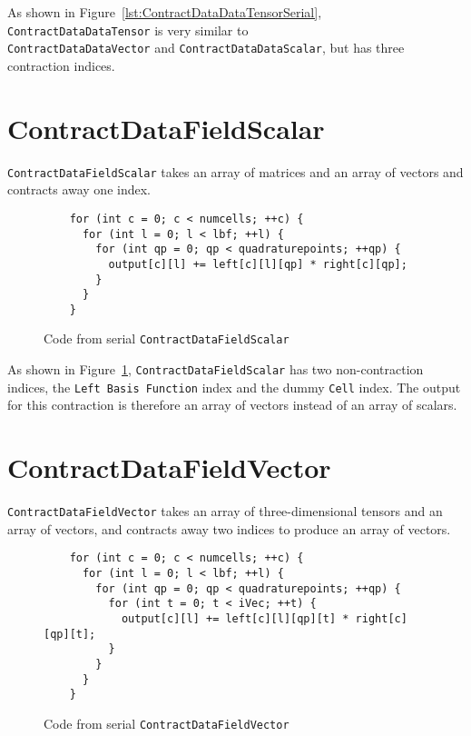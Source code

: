 As shown in Figure~\ref{lst:ContractDataDataTensorSerial},
\texttt{ContractDataDataTensor} is very similar to\\
\texttt{ContractDataDataVector} and \texttt{ContractDataDataScalar}, but has
three contraction indices.

\section{ContractDataFieldScalar}

\texttt{ContractDataFieldScalar} takes an array of matrices and an array of
vectors and contracts away one index.

\begin{figure}[ht]
    \begin{lstlisting}
    for (int c = 0; c < numcells; ++c) {
      for (int l = 0; l < lbf; ++l) {
        for (int qp = 0; qp < quadraturepoints; ++qp) {
          output[c][l] += left[c][l][qp] * right[c][qp];
        }
      }
    }
    \end{lstlisting}
\caption{Code from serial \texttt{ContractDataFieldScalar}
\label{lst:ContractDataFieldScalarSerial}} 
\end{figure}

As shown in Figure~\ref{lst:ContractDataFieldScalarSerial},
\texttt{ContractDataFieldScalar} has two non-contraction indices, the
\texttt{Left Basis Function} index and the dummy \texttt{Cell} index.  The
output for this contraction is therefore an array of vectors instead of an array
of scalars.

\section{ContractDataFieldVector}
\texttt{ContractDataFieldVector} takes an array of three-dimensional tensors and
an array of vectors, and contracts away two indices to produce an array of
vectors.

\begin{figure}[ht]
    \begin{lstlisting}
    for (int c = 0; c < numcells; ++c) {
      for (int l = 0; l < lbf; ++l) {
        for (int qp = 0; qp < quadraturepoints; ++qp) {
          for (int t = 0; t < iVec; ++t) {
            output[c][l] += left[c][l][qp][t] * right[c][qp][t];
          }
        }
      }
    }
    \end{lstlisting}
\caption{Code from serial \texttt{ContractDataFieldVector}
\label{lst:ContractDataFieldVectorSerial}} 
\end{figure}


